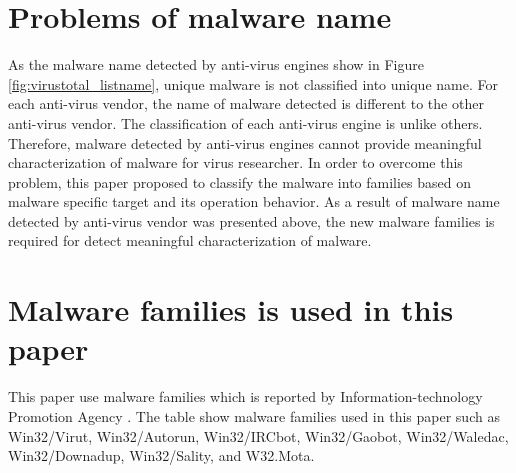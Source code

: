 \section{Problems of malware name} 
As the malware name detected by anti-virus engines show in Figure \ref{fig:virustotal_listname}, unique malware is not classified into unique name. For each anti-virus vendor, the name of malware detected is different to the other anti-virus vendor. The classification of each anti-virus engine is unlike others. Therefore, malware detected by anti-virus engines cannot provide meaningful characterization of malware for virus researcher. In order to overcome this problem, this paper proposed to classify the malware into families based on malware specific target and its operation behavior. 
As a result of malware name detected by anti-virus vendor was presented above, the new malware families is required for detect meaningful characterization of malware. 
\section{Malware families is used in this paper} 
This paper use malware families which is reported by Information-technology Promotion Agency \cite{ipa}. The table show malware families used in this paper such as Win32/Virut, Win32/Autorun, Win32/IRCbot, Win32/Gaobot, Win32/Waledac, Win32/Downadup, Win32/Sality, and W32.Mota.

